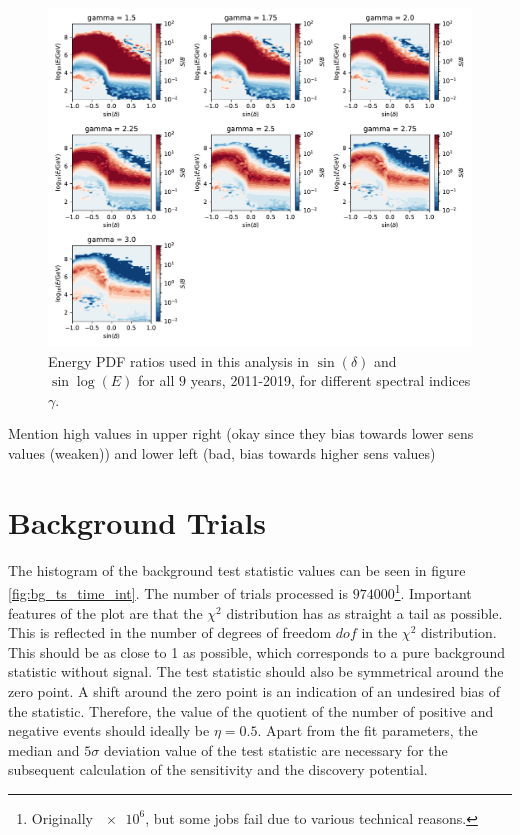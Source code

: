 \begin{figure}
    \centering
    \includegraphics[width=\linewidth]{Plots/05_csky/energy_pdf_ratio.pdf}
    \caption{Energy PDF ratios used in this analysis in $\sin{(\delta)}$ and $\sin{\log{(E)}}$ for all $\num{9}$ years, 2011-2019, for different spectral indices $\gamma$.}
    \label{fig:energy_ratio_time_int}
\end{figure}

Mention high values in upper right (okay since they bias towards lower sens values (weaken)) and lower left (bad, bias towards higher sens values)

\section{Background Trials}

The histogram of the background test statistic values can be seen in figure \ref{fig:bg_ts_time_int}.
The number of trials processed is $\num{974000}$\footnote{Originally $\num{e6}$, but some jobs fail due to various technical reasons.}.
Important features of the plot are that the $\chi^2$ distribution has as straight a tail as possible.
This is reflected in the number of degrees of freedom $dof$ in the $\chi^2$ distribution.
This should be as close to 1 as possible, which corresponds to a pure background statistic without signal.
The test statistic should also be symmetrical around the zero point.
A shift around the zero point is an indication of an undesired bias of the statistic.
Therefore, the value of the quotient of the number of positive and negative events should ideally be $\eta = \num{0.5}$.
Apart from the fit parameters, the median and $5\sigma$ deviation value of the test statistic are necessary for the subsequent calculation of the sensitivity and the discovery potential.

